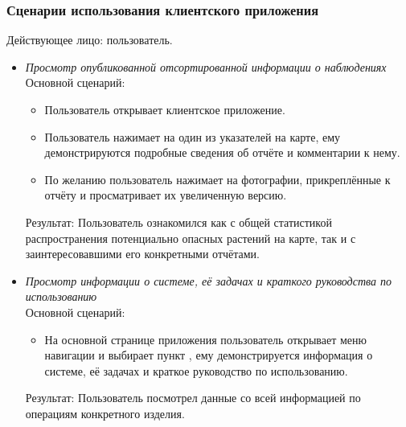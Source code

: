 
\subsubsection{Сценарии использования клиентского приложения}

\tab
Действующее лицо: пользователь.

\begin{itemize}[topsep=0pt, parsep=0pt, itemsep=0pt, leftmargin=*, labelindent=0.5cm]
	\item \textit{Просмотр опубликованной отсортированной информации о наблюдениях} \\
	Основной сценарий:
	\begin{itemize}[topsep=0pt, parsep=0pt, itemsep=0pt, leftmargin=*, labelindent=0.5cm]
		\item Пользователь открывает клиентское приложение.
		\item Пользователь нажимает на один из указателей на карте, ему демонстрируются подробные сведения об отчёте и комментарии к нему.
		\item По желанию пользователь нажимает на фотографии, прикреплённые к отчёту и просматривает их увеличенную версию.
	\end{itemize}
	Результат: Пользователь ознакомился как с общей статистикой распространения потенциально опасных растений на карте, так и с заинтересовавшими его конкретными отчётами.
	
	\item \textit{Просмотр информации о системе, её задачах и краткого руководства по использованию} \\
	Основной сценарий:
	\begin{itemize}[topsep=0pt, parsep=0pt, itemsep=0pt, leftmargin=*, labelindent=0.5cm]
		\item На основной странице приложения пользователь открывает меню навигации и выбирает пункт , ему демонстрируется информация о системе, её задачах и краткое руководство по использованию.
	\end{itemize}
	Результат: Пользователь посмотрел данные со всей информацией по операциям конкретного изделия.
	

\end{itemize}
